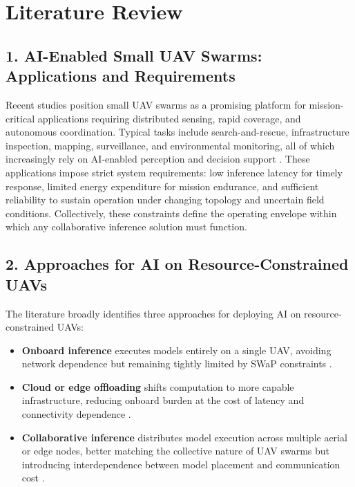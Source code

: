 \section*{Literature Review}

\subsection*{1. AI-Enabled Small UAV Swarms: Applications and Requirements}
Recent studies position small UAV swarms as a promising platform for mission-critical applications requiring distributed sensing, rapid coverage, and autonomous coordination. Typical tasks include search-and-rescue, infrastructure inspection, mapping, surveillance, and environmental monitoring, all of which increasingly rely on AI-enabled perception and decision support \cite{mcenroe2022survey,jung2024edgeai,clerigues2024mission}. These applications impose strict system requirements: low inference latency for timely response, limited energy expenditure for mission endurance, and sufficient reliability to sustain operation under changing topology and uncertain field conditions. Collectively, these constraints define the operating envelope within which any collaborative inference solution must function.

\subsection*{2. Approaches for AI on Resource-Constrained UAVs}
The literature broadly identifies three approaches for deploying AI on resource-constrained UAVs:

\begin{itemize}
  \item \textbf{Onboard inference} executes models entirely on a single UAV, avoiding network dependence but remaining tightly limited by SWaP constraints \cite{mcenroe2022survey}.
  \item \textbf{Cloud or edge offloading} shifts computation to more capable infrastructure, reducing onboard burden at the cost of latency and connectivity dependence \cite{mao2017mec,baktayan2024slr}.
  \item \textbf{Collaborative inference} distributes model execution across multiple aerial or edge nodes, better matching the collective nature of UAV swarms but introducing interdependence between model placement and communication cost \cite{qu2024elastic,hu2025splitreview,kang2017neurosurgeon,laskaridis2020spinn}.
\end{itemize}

